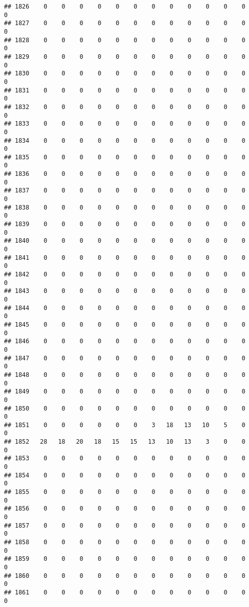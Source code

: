 \documentclass[]{article}
\begin{document}
\begin{verbatim}
## 1826    0    0    0    0    0    0    0    0    0    0    0    0    0
## 1827    0    0    0    0    0    0    0    0    0    0    0    0    0
## 1828    0    0    0    0    0    0    0    0    0    0    0    0    0
## 1829    0    0    0    0    0    0    0    0    0    0    0    0    0
## 1830    0    0    0    0    0    0    0    0    0    0    0    0    0
## 1831    0    0    0    0    0    0    0    0    0    0    0    0    0
## 1832    0    0    0    0    0    0    0    0    0    0    0    0    0
## 1833    0    0    0    0    0    0    0    0    0    0    0    0    0
## 1834    0    0    0    0    0    0    0    0    0    0    0    0    0
## 1835    0    0    0    0    0    0    0    0    0    0    0    0    0
## 1836    0    0    0    0    0    0    0    0    0    0    0    0    0
## 1837    0    0    0    0    0    0    0    0    0    0    0    0    0
## 1838    0    0    0    0    0    0    0    0    0    0    0    0    0
## 1839    0    0    0    0    0    0    0    0    0    0    0    0    0
## 1840    0    0    0    0    0    0    0    0    0    0    0    0    0
## 1841    0    0    0    0    0    0    0    0    0    0    0    0    0
## 1842    0    0    0    0    0    0    0    0    0    0    0    0    0
## 1843    0    0    0    0    0    0    0    0    0    0    0    0    0
## 1844    0    0    0    0    0    0    0    0    0    0    0    0    0
## 1845    0    0    0    0    0    0    0    0    0    0    0    0    0
## 1846    0    0    0    0    0    0    0    0    0    0    0    0    0
## 1847    0    0    0    0    0    0    0    0    0    0    0    0    0
## 1848    0    0    0    0    0    0    0    0    0    0    0    0    0
## 1849    0    0    0    0    0    0    0    0    0    0    0    0    0
## 1850    0    0    0    0    0    0    0    0    0    0    0    0    0
## 1851    0    0    0    0    0    0    3   18   13   10    5    0    0
## 1852   28   18   20   18   15   15   13   10   13    3    0    0    0
## 1853    0    0    0    0    0    0    0    0    0    0    0    0    0
## 1854    0    0    0    0    0    0    0    0    0    0    0    0    0
## 1855    0    0    0    0    0    0    0    0    0    0    0    0    0
## 1856    0    0    0    0    0    0    0    0    0    0    0    0    0
## 1857    0    0    0    0    0    0    0    0    0    0    0    0    0
## 1858    0    0    0    0    0    0    0    0    0    0    0    0    0
## 1859    0    0    0    0    0    0    0    0    0    0    0    0    0
## 1860    0    0    0    0    0    0    0    0    0    0    0    0    0
## 1861    0    0    0    0    0    0    0    0    0    0    0    0    0

\end{verbatim}
\end{document}
